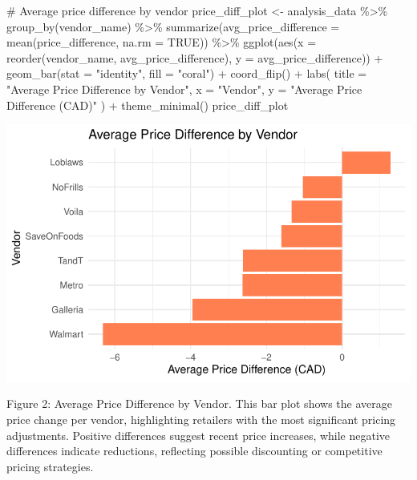 \documentclass[
  letterpaper,
  DIV=11,
  numbers=noendperiod]{scrartcl}
\newenvironment{Shaded}{\begin{snugshade}}{\end{snugshade}}
\newcommand{\AttributeTok}[1]{\textcolor[rgb]{0.40,0.45,0.13}{#1}}
\newcommand{\CommentTok}[1]{\textcolor[rgb]{0.37,0.37,0.37}{#1}}
\newcommand{\ConstantTok}[1]{\textcolor[rgb]{0.56,0.35,0.01}{#1}}
\newcommand{\FunctionTok}[1]{\textcolor[rgb]{0.28,0.35,0.67}{#1}}
\newcommand{\NormalTok}[1]{\textcolor[rgb]{0.00,0.23,0.31}{#1}}
\newcommand{\OtherTok}[1]{\textcolor[rgb]{0.00,0.23,0.31}{#1}}
\newcommand{\SpecialCharTok}[1]{\textcolor[rgb]{0.37,0.37,0.37}{#1}}
\newcommand{\StringTok}[1]{\textcolor[rgb]{0.13,0.47,0.30}{#1}}
\begin{document}
\begin{Shaded}
\begin{Highlighting}[]
\CommentTok{\# Average price difference by vendor}
\NormalTok{price\_diff\_plot }\OtherTok{\textless{}{-}}\NormalTok{ analysis\_data }\SpecialCharTok{\%\textgreater{}\%}
  \FunctionTok{group\_by}\NormalTok{(vendor\_name) }\SpecialCharTok{\%\textgreater{}\%}
  \FunctionTok{summarize}\NormalTok{(}\AttributeTok{avg\_price\_difference =} \FunctionTok{mean}\NormalTok{(price\_difference, }\AttributeTok{na.rm =} \ConstantTok{TRUE}\NormalTok{)) }\SpecialCharTok{\%\textgreater{}\%}
  \FunctionTok{ggplot}\NormalTok{(}\FunctionTok{aes}\NormalTok{(}\AttributeTok{x =} \FunctionTok{reorder}\NormalTok{(vendor\_name, avg\_price\_difference), }\AttributeTok{y =}\NormalTok{ avg\_price\_difference)) }\SpecialCharTok{+}
  \FunctionTok{geom\_bar}\NormalTok{(}\AttributeTok{stat =} \StringTok{"identity"}\NormalTok{, }\AttributeTok{fill =} \StringTok{"coral"}\NormalTok{) }\SpecialCharTok{+}
  \FunctionTok{coord\_flip}\NormalTok{() }\SpecialCharTok{+}
  \FunctionTok{labs}\NormalTok{(}
    \AttributeTok{title =} \StringTok{"Average Price Difference by Vendor"}\NormalTok{,}
    \AttributeTok{x =} \StringTok{"Vendor"}\NormalTok{,}
    \AttributeTok{y =} \StringTok{"Average Price Difference (CAD)"}
\NormalTok{  ) }\SpecialCharTok{+}
  \FunctionTok{theme\_minimal}\NormalTok{()}
\NormalTok{price\_diff\_plot}
\end{Highlighting}
\end{Shaded}

\includegraphics{paper_files/figure-pdf/unnamed-chunk-5-1.pdf}

Figure 2: Average Price Difference by Vendor. This bar plot shows the
average price change per vendor, highlighting retailers with the most
significant pricing adjustments. Positive differences suggest recent
price increases, while negative differences indicate reductions,
reflecting possible discounting or competitive pricing strategies.
\end{document}
